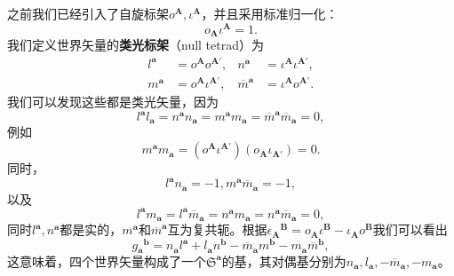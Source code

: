 之前我们已经引入了自旋标架$o^{\boldsymbol{A}} ,\iota ^{\boldsymbol{A}}$，并且采用标准归一化：
\begin{equation*}
	o_{\boldsymbol{A}} \iota ^{\boldsymbol{A}} =1.
\end{equation*}
我们定义世界矢量的\textbf{类光标架}（null tetrad）为
\begin{equation*}
	\begin{aligned}
		l^{\boldsymbol{a}} & =o^{\boldsymbol{A}} o^{\boldsymbol{A} '} , & n^{\boldsymbol{a}} & =\iota ^{\boldsymbol{A}} \iota ^{\boldsymbol{A} '} ,\\
		m^{\boldsymbol{a}} & =o^{\boldsymbol{A}} \iota ^{\boldsymbol{A} '} , & \overline{m}^{\boldsymbol{a}} & =\iota ^{\boldsymbol{A}} o^{\boldsymbol{A} '} .
	\end{aligned}
\end{equation*}
我们可以发现这些都是类光矢量，因为
\begin{equation*}
	l^{\boldsymbol{a}} l_{\boldsymbol{a}} =n^{\boldsymbol{a}} n_{\boldsymbol{a}} =m^{\boldsymbol{a}} m_{\boldsymbol{a}} =\overline{m}^{\boldsymbol{a}}\overline{m}_{\boldsymbol{a}} =0,
\end{equation*}
例如
\begin{equation*}
	m^{\boldsymbol{a}} m_{\boldsymbol{a}} =(o^{\boldsymbol{A}} \iota ^{\boldsymbol{A} '} )(o_{\boldsymbol{A}} \iota _{\boldsymbol{A} '} )=0.
\end{equation*}
同时，
\begin{equation*}
	l^{\boldsymbol{a}} n_{\boldsymbol{a}} =-1,m^{\boldsymbol{a}}\overline{m}_{\boldsymbol{a}} =-1,
\end{equation*}
以及
\begin{equation*}
	l^{\boldsymbol{a}} m_{\boldsymbol{a}} =l^{\boldsymbol{a}}\overline{m}_{\boldsymbol{a}} =n^{\boldsymbol{a}} m_{\boldsymbol{a}} =n^{\boldsymbol{a}}\overline{m}_{\boldsymbol{a}} =0,
\end{equation*}
同时$l^{\boldsymbol{a}} ,n^{\boldsymbol{a}}$都是实的，$m^{\boldsymbol{a}}$和$\overline{m}^{\boldsymbol{a}}$互为复共轭。根据$\epsilon {_{\boldsymbol{A}}}^{\boldsymbol{B}} =o_{\boldsymbol{A}} \iota ^{\boldsymbol{B}} -\iota _{\boldsymbol{A}} o^{\boldsymbol{B}}$我们可以看出
\begin{equation*}
	g{_{\boldsymbol{a}}}^{\boldsymbol{b}} =n_{\boldsymbol{a}} l^{\boldsymbol{a}} +l_{\boldsymbol{a}} n^{\boldsymbol{b}} -\overline{m}_{\boldsymbol{a}} m^{\boldsymbol{b}} -m_{\boldsymbol{a}}\overline{m}^{\boldsymbol{b}} ,
\end{equation*}
这意味着，四个世界矢量构成了一个$\mathfrak{S}^{\boldsymbol{a}}$的基，其对偶基分别为$n_{\boldsymbol{a}} ,l_{\boldsymbol{a}} ,-\overline{m}_{\boldsymbol{a}} ,-m_{\boldsymbol{a}}$。



